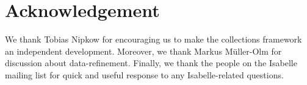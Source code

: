 \section{Acknowledgement}
We thank Tobias Nipkow for encouraging us to make the collections framework an independent development. Moreover, we thank Markus M\"uller-Olm for discussion about data-refinement. Finally, we thank the people on the Isabelle mailing list for quick and useful response to any Isabelle-related questions.
